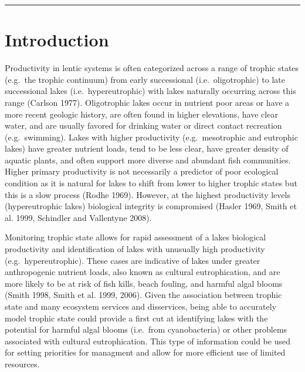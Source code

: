 \documentclass[11pt,]{article}
\begin{document}
\hrule

\doublespace

\section{Introduction}\label{introduction}

Productivity in lentic systems is often categorized across a range of
trophic states (e.g.~the trophic continuum) from early successional
(i.e.~oligotrophic) to late successional lakes (i.e.~hypereutrophic)
with lakes naturally occurring across this range (Carlson 1977).
Oligotrophic lakes occur in nutrient poor areas or have a more recent
geologic history, are often found in higher elevations, have clear
water, and are usually favored for drinking water or direct contact
recreation (e.g.~swimming). Lakes with higher productivity
(e.g.~mesotrophic and eutrophic lakes) have greater nutrient loads, tend
to be less clear, have greater density of aquatic plants, and often
support more diverse and abundant fish communities. Higher primary
productivity is not necessarily a predictor of poor ecological condition
as it is natural for lakes to shift from lower to higher trophic states
but this is a slow process (Rodhe 1969). However, at the highest
productivity levels (hypereutrophic lakes) biological integrity is
compromised (Hasler 1969, Smith et al. 1999, Schindler and Vallentyne
2008).

Monitoring trophic state allows for rapid assessment of a lakes
biological productivity and identification of lakes with unusually high
productivity (e.g.~hypereutrophic). These cases are indicative of lakes
under greater anthropogenic nutrient loads, also known as cultural
eutrophication, and are more likely to be at risk of fish kills, beach
fouling, and harmful algal blooms (Smith 1998, Smith et al. 1999, 2006).
Given the association between trophic state and many ecosystem services
and disservices, being able to accurately model trophic state could
provide a first cut at identifying lakes with the potential for harmful
algal blooms (i.e.~from cyanobacteria) or other problems associated with
cultural eutrophication. This type of information could be used for
setting priorities for managment and allow for more efficient use of
limited resources.
\end{document}
